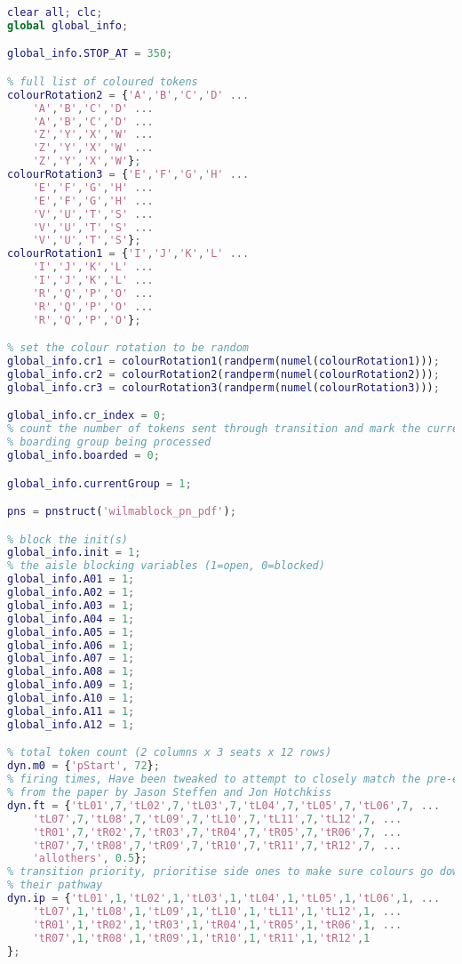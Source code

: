 \begin{lstlisting}[language=MATLAB, caption=wilmablock.m]
clear all; clc;
global global_info;

global_info.STOP_AT = 350;

% full list of coloured tokens
colourRotation2 = {'A','B','C','D' ...
    'A','B','C','D' ...
    'A','B','C','D' ...
    'Z','Y','X','W' ...
    'Z','Y','X','W' ...
    'Z','Y','X','W'};
colourRotation3 = {'E','F','G','H' ...
    'E','F','G','H' ...
    'E','F','G','H' ...
    'V','U','T','S' ... 
    'V','U','T','S' ...
    'V','U','T','S'};
colourRotation1 = {'I','J','K','L' ...
    'I','J','K','L' ...
    'I','J','K','L' ...
    'R','Q','P','O' ...
    'R','Q','P','O' ...
    'R','Q','P','O'};

% set the colour rotation to be random
global_info.cr1 = colourRotation1(randperm(numel(colourRotation1)));
global_info.cr2 = colourRotation2(randperm(numel(colourRotation2)));
global_info.cr3 = colourRotation3(randperm(numel(colourRotation3)));

global_info.cr_index = 0;
% count the number of tokens sent through transition and mark the current
% boarding group being processed
global_info.boarded = 0;

global_info.currentGroup = 1;

pns = pnstruct('wilmablock_pn_pdf');

% block the init(s)
global_info.init = 1;
% the aisle blocking variables (1=open, 0=blocked)
global_info.A01 = 1;
global_info.A02 = 1;
global_info.A03 = 1;
global_info.A04 = 1;
global_info.A05 = 1;
global_info.A06 = 1;
global_info.A07 = 1;
global_info.A08 = 1;
global_info.A09 = 1;
global_info.A10 = 1;
global_info.A11 = 1;
global_info.A12 = 1;

% total token count (2 columns x 3 seats x 12 rows)
dyn.m0 = {'pStart', 72};
% firing times, Have been tweaked to attempt to closely match the pre-existing results
% from the paper by Jason Steffen and Jon Hotchkiss
dyn.ft = {'tL01',7,'tL02',7,'tL03',7,'tL04',7,'tL05',7,'tL06',7, ...
    'tL07',7,'tL08',7,'tL09',7,'tL10',7,'tL11',7,'tL12',7, ...
    'tR01',7,'tR02',7,'tR03',7,'tR04',7,'tR05',7,'tR06',7, ...
    'tR07',7,'tR08',7,'tR09',7,'tR10',7,'tR11',7,'tR12',7, ...
    'allothers', 0.5};
% transition priority, prioritise side ones to make sure colours go down
% their pathway
dyn.ip = {'tL01',1,'tL02',1,'tL03',1,'tL04',1,'tL05',1,'tL06',1, ...
    'tL07',1,'tL08',1,'tL09',1,'tL10',1,'tL11',1,'tL12',1, ...
    'tR01',1,'tR02',1,'tR03',1,'tR04',1,'tR05',1,'tR06',1, ...
    'tR07',1,'tR08',1,'tR09',1,'tR10',1,'tR11',1,'tR12',1
};


\end{lstlisting}
